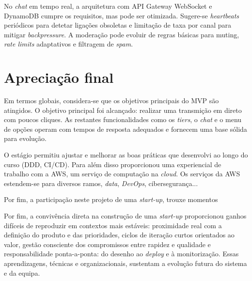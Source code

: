 No \textit{chat} em tempo real, a arquitetura com API Gateway WebSocket e DynamoDB cumpre os requisitos, mas pode ser otimizada. Sugere-se \textit{heartbeats} periódicos para detetar ligações obsoletas e limitação de taxa por canal para mitigar \textit{backpressure}. A moderação pode evoluir de regras básicas para muting, \textit{rate limits} adaptativos e filtragem de \textit{spam}.

\section{Apreciação final} 

Em termos globais, considera-se que os objetivos principais do MVP são atingidos. O objetivo principal foi alcançado: realizar uma transmição em direto com poucos cliques. As restantes funcionalidades como os \textit{tiers}, o \textit{chat} e o menu de opções operam com tempos de resposta adequados e fornecem uma base sólida para evolução. 

O estágio permitiu ajustar e melhorar as boas práticas que desenvolvi ao longo do curso (DDD, CI/CD). Para além disso proporcionou uma experiencial de trabalho com a AWS, um serviço de computação na \textit{cloud}. Os serviços da AWS estendem-se para diversos ramos, \textit{data}, \textit{DevOps}, cibersegurança...

Por fim, a participação neste projeto de uma \textit{start-up}, trouxe momentos 

Por fim, a convivência direta na construção de uma \textit{start-up} proporcionou ganhos difíceis de reproduzir em contextos mais estáveis: proximidade real com a definição do produto e das prioridades, ciclos de iteração curtos orientados ao valor, gestão consciente dos compromissos entre rapidez e qualidade e responsabilidade ponta-a-ponta: do desenho ao \textit{deploy} e à monitorização. Essas aprendizagens, técnicas e organizacionais, sustentam a evolução futura do sistema e da equipa. 